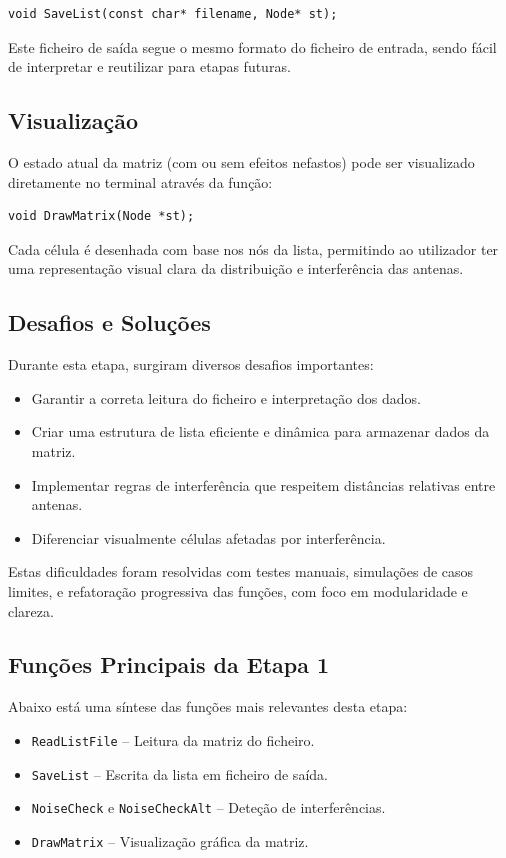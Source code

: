 \documentclass[a4paper,12pt]{article}
\begin{document}
\begin{lstlisting}[style=CStyle]
void SaveList(const char* filename, Node* st);
\end{lstlisting}

Este ficheiro de saída segue o mesmo formato do ficheiro de entrada, sendo fácil de interpretar e reutilizar para etapas futuras.

\subsection{Visualização}
O estado atual da matriz (com ou sem efeitos nefastos) pode ser visualizado diretamente no terminal através da função:

\begin{lstlisting}[style=CStyle]
void DrawMatrix(Node *st);
\end{lstlisting}

Cada célula é desenhada com base nos nós da lista, permitindo ao utilizador ter uma representação visual clara da distribuição e interferência das antenas.

\subsection{Desafios e Soluções}
Durante esta etapa, surgiram diversos desafios importantes:

\begin{itemize}
    \item Garantir a correta leitura do ficheiro e interpretação dos dados.
    \item Criar uma estrutura de lista eficiente e dinâmica para armazenar dados da matriz.
    \item Implementar regras de interferência que respeitem distâncias relativas entre antenas.
    \item Diferenciar visualmente células afetadas por interferência.
\end{itemize}

Estas dificuldades foram resolvidas com testes manuais, simulações de casos limites, e refatoração progressiva das funções, com foco em modularidade e clareza.

\subsection{Funções Principais da Etapa 1}
Abaixo está uma síntese das funções mais relevantes desta etapa:

\begin{itemize}
    \item \texttt{ReadListFile} – Leitura da matriz do ficheiro.
    \item \texttt{SaveList} – Escrita da lista em ficheiro de saída.
    \item \texttt{NoiseCheck} e \texttt{NoiseCheckAlt} – Deteção de interferências.
    \item \texttt{DrawMatrix} – Visualização gráfica da matriz.
\end{itemize}
\end{document}
